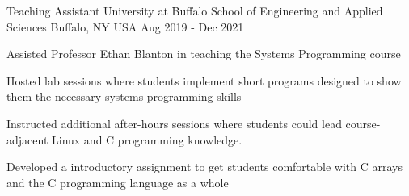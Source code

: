 \begin{cventries}
  \cventry
    {Teaching Assistant} %
    {University at Buffalo School of Engineering and Applied Sciences} %
    {Buffalo, NY USA} %
    {Aug 2019 - Dec 2021} %
    {
      \begin{cvitems} %
        \item Assisted Professor Ethan Blanton in teaching the Systems Programming course
        \item Hosted lab sessions where students implement short programs designed to show them the necessary systems programming skills
        \item Instructed additional after-hours sessions where students could lead course-adjacent Linux and C programming knowledge.
        \item Developed a introductory assignment to get students comfortable with C arrays and the C programming language as a whole
      \end{cvitems}
    }

\end{cventries}
